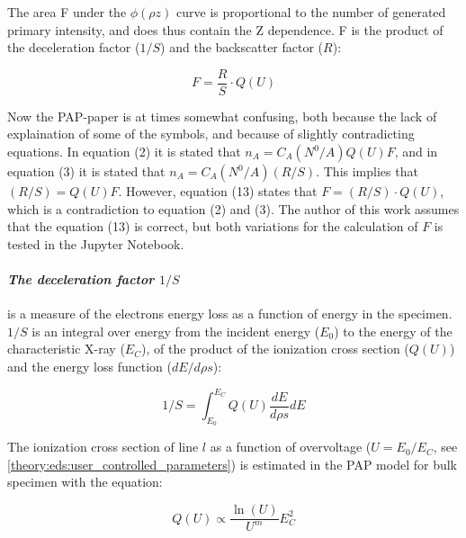 The area F under the $\phi(\rho z)$ curve is proportional to the number of generated primary intensity, and does thus contain the Z dependence.
F is the product of the deceleration factor ($1/S$) and the backscatter factor ($R$):

\begin{equation}
    \label{eq:theory:quantitative:pap:calculation_of_F:F}
    F = \frac{R}{S} \cdot Q(U)
\end{equation}


Now the PAP-paper is at times somewhat confusing, both because the lack of explaination of some of the symbols, and because of slightly contradicting equations.
In equation (2) it is stated that $n_A = C_A (N^0/A) Q(U) F$, and in equation (3) it is stated that $n_A = C_A (N^0/A) (R/S)$.
This implies that $(R/S) = Q(U) F$.
However, equation (13) states that $F = (R/S) \cdot Q(U)$, which is a contradiction to equation (2) and (3).
The author of this work assumes that the equation (13) is correct, but both variations for the calculation of $F$ is tested in the Jupyter Notebook.






\paragraph*{\emph{The deceleration factor $1/S$}} is a measure of the electrons energy loss as a function of energy in the specimen. $1/S$ is an integral over energy from the incident energy ($E_0$) to the energy of the characteristic X-ray ($E_C$), of the product of the ionization cross section ($Q(U)$) and the energy loss function ($dE/d\rho s$):

\begin{equation}
    \label{eq:theory:quantitative:pap:calculation_of_F:S}
    1/S = \int_{E_0}^{E_C} Q(U)\frac{dE}{d\rho s} dE
\end{equation}

The ionization cross section of line $l$ as a function of overvoltage ($U = E_0/E_C$, see \cref{theory:eds:user_controlled_parameters}) is estimated in the PAP model for bulk specimen with the equation:

\begin{equation}
    \label{eq:theory:quantitative:pap:calculation_of_F:ionizationcrosssection}
    Q(U) \propto \frac{\ln(U)}{U^m} E_C^2
\end{equation}

